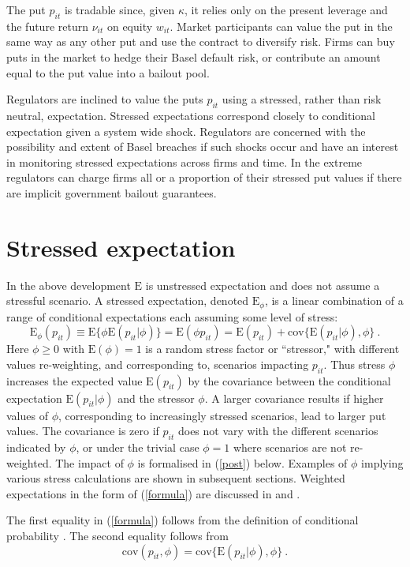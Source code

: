 \documentclass[authoryear]{elsarticle}
\newcommand{\E}{\mathrm{E}}
\newcommand{\cov}{\mathrm{cov}}
\newcommand{\Es}{\E_\phi}
\newcommand{\eref}[1]{(\ref{#1})}
\newcommand{\be}[1]{\begin{equation}\label{#1}}
\newcommand{\ee}{\end{equation}}
\begin{document}
The put $p_{it}$ is tradable since, given $\kappa$, it relies only on the present leverage and the future return $\nu_{it}$ on equity $w_{it}$.  Market participants can value the put in  the same way as any other put and use the contract to diversify risk.  Firms can buy puts in the market to hedge their Basel default risk, or contribute an amount equal to the put value into a bailout pool.

Regulators are inclined to value the puts $p_{it}$ using a stressed, rather than risk neutral, expectation.   Stressed expectations correspond closely to conditional expectation given a system wide shock.    Regulators are concerned with the possibility and extent of Basel breaches if such shocks occur and  have an  interest in monitoring stressed expectations across firms and time.   In the extreme regulators can charge firms all or a  proportion of their stressed put values if there are implicit government bailout guarantees.



\section{Stressed expectation}

In the above development $\E$  is  unstressed expectation and does not assume a stressful scenario.   A stressed expectation, denoted $\Es$, is a
linear combination of a range of conditional expectations each assuming some level of stress:
\be{formula}
 \Es(p_{it}) \equiv \E\{\phi\E(p_{it}|\phi)\} = \E(\phi p_{it}) = \E(p_{it}) + \cov\{\E(p_{it}|\phi),\phi\}\ .
\ee
Here $\phi\ge 0$ with $\E(\phi)=1$ is a random stress factor or ``stressor,"  with different values re-weighting, and corresponding to, scenarios impacting $p_{it}$.  Thus stress $\phi$ increases the expected value $\E(p_{it})$ by the covariance between the conditional expectation $\E(p_{it}|\phi)$  and the stressor $\phi$. A larger covariance results if higher values of $\phi$, corresponding to increasingly stressed scenarios, lead to larger put values. The covariance is zero if $p_{it}$ does not vary with the different scenarios indicated by $\phi$, or under the trivial case $\phi=1$ where scenarios are not re-weighted. The impact of $\phi$ is formalised in \eref{post} below. Examples of $\phi$ implying various stress calculations are shown in subsequent sections. Weighted expectations in the form of \eref{formula} are discussed in \cite{choo2010determining} and \cite{furman2008weighted1}.

The first equality in \eref{formula} follows from the definition of conditional probability \citep{whittle2000probability}.  The second equality follows from
$$
\cov(p_{it},\phi)=\cov\{\E(p_{it}|\phi),\phi\}\ .
$$
\end{document}
